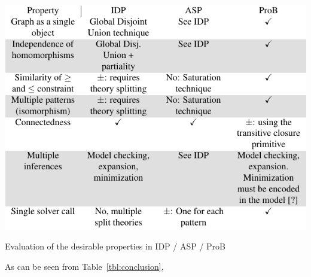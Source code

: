 \def\checkmark{\tikz\fill[scale=0.4](0,.35) -- (.25,0) -- (1,.7) -- (.25,.15) -- cycle;} 

\begin{table}[h]
\begin{center}
\includegraphics{PropertyTable-crop.pdf}
\end{center}
\caption{Evaluation of the desirable properties in IDP / ASP / ProB\label{tbl:conclusion}}
\end{table}

As can be seen from Table~\ref{tbl:conclusion}, 

